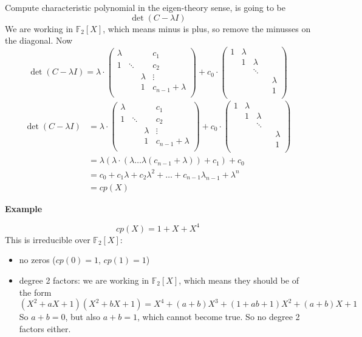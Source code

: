 \documentclass[language=english,number=]{homework}
\begin{document}
Compute characteristic polynomial in the eigen-theory sense, is going to be
\[
\det(C - \lambda I)
\]
We are working in $\mathbb{F}_2[X]$, which means minus is plus, so remove the minusses on the diagonal.
Now
\[
\det(C - \lambda I) = \lambda \cdot \begin{pmatrix}
\lambda & & & c_1 \\
1 & \ddots & & c_2 \\
& &  \lambda& \vdots \\
& & 1& c_{n-1} + \lambda \\
\end{pmatrix} + c_0 \cdot \begin{pmatrix}
1 & \lambda & & & \\
& 1 & \lambda & &  \\
& & \ddots & &  \\
& & & &\lambda  \\
& & & & 1 \\
\end{pmatrix}
\]
\begin{align*}
\det(C - \lambda I) &= \lambda \cdot \begin{pmatrix}
\lambda & & & c_1 \\
1 & \ddots & & c_2 \\
& &  \lambda& \vdots \\
& & 1& c_{n-1} + \lambda \\
\end{pmatrix} + c_0 \cdot \begin{pmatrix}
1 & \lambda & & & \\
& 1 & \lambda & &  \\
& & \ddots & &  \\
& & & &\lambda  \\
& & & & 1 \\
\end{pmatrix} \\
&= \lambda (\lambda \cdot (\lambda \dots \lambda (c_{n-1} + \lambda)) + c_1) + c_0 \\
&= c_0 + c_1 \lambda + c_2 \lambda^2 + \dots + c_{n-1} \lambda_{n-1} + \lambda^n \\
&= cp(X)
\end{align*}

\textbf*{Example}

\[
cp(X) = 1 + X + X^4
\]
This is irreducible over $\mathbb{F}_2[X]$:
\begin{itemize}
\item no zeros ($cp(0) = 1$, $cp(1) = 1$)
\item degree 2 factors: we are working in $\mathbb{F}_2[X]$, which means they should be of the form
\[
(X^2 + aX + 1)(X^2 + bX + 1) = X^4 + (a+b) X^3 + (1 + ab + 1)X^2 + (a+b)X + 1
\]
So $a+b = 0$, but also $a + b = 1$, which cannot become true.
So no degree 2 factors either.
\end{itemize}
\end{document}
